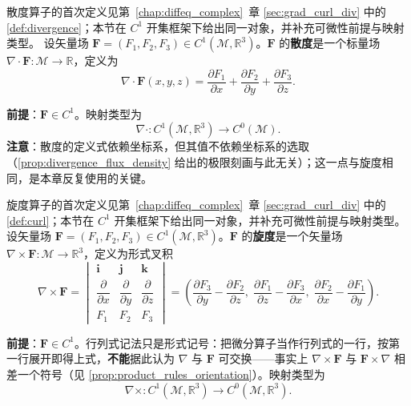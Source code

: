 \begin{definition}[散度]\label{def:divergence_vf}
散度算子的首次定义见第~\ref{chap:diffeq_complex}~章 \cref{sec:grad_curl_div} 中的 \cref{def:divergence}；本节在 $C^1$ 开集框架下给出同一对象，并补充可微性前提与映射类型。
设矢量场 $\mathbf{F} = (F_1, F_2, F_3) \in C^1(\mathcal{M}, \mathbb{R}^3)$。$\mathbf{F}$ 的\textbf{散度}是一个标量场 $\nabla \cdot \mathbf{F}: \mathcal{M} \to \mathbb{R}$，定义为
\[
\nabla \cdot \mathbf{F}(x,y,z) = \frac{\partial F_1}{\partial x} + \frac{\partial F_2}{\partial y} + \frac{\partial F_3}{\partial z}.
\]

\textbf{前提}：$\mathbf F\in C^1$。映射类型为
\[
\nabla\cdot: C^1(\mathcal{M}, \mathbb{R}^3) \to C^0(\mathcal{M}).
\]
\textbf{注意}：散度的定义式依赖坐标系，但其值不依赖坐标系的选取（\cref{prop:divergence_flux_density} 给出的极限刻画与此无关）；这一点与旋度相同，是本章反复使用的关键。
\end{definition}

\begin{definition}[旋度]\label{def:curl_vf}
旋度算子的首次定义见第~\ref{chap:diffeq_complex}~章 \cref{sec:grad_curl_div} 中的 \cref{def:curl}；本节在 $C^1$ 开集框架下给出同一对象，并补充可微性前提与映射类型。
设矢量场 $\mathbf{F} = (F_1, F_2, F_3) \in C^1(\mathcal{M}, \mathbb{R}^3)$。$\mathbf{F}$ 的\textbf{旋度}是一个矢量场 $\nabla \times \mathbf{F}: \mathcal{M} \to \mathbb{R}^3$，定义为形式叉积
\[
\nabla \times \mathbf{F} = \begin{vmatrix}
\mathbf{i} & \mathbf{j} & \mathbf{k} \\[2pt]
\dfrac{\partial}{\partial x} & \dfrac{\partial}{\partial y} & \dfrac{\partial}{\partial z} \\[6pt]
F_1 & F_2 & F_3
\end{vmatrix}
= \left( \frac{\partial F_3}{\partial y} - \frac{\partial F_2}{\partial z},\;
\frac{\partial F_1}{\partial z} - \frac{\partial F_3}{\partial x},\;
\frac{\partial F_2}{\partial x} - \frac{\partial F_1}{\partial y} \right).
\]

\textbf{前提}：$\mathbf F\in C^1$。行列式记法只是形式记号：把微分算子当作行列式的一行，按第一行展开即得上式，\textbf{不能}据此认为 $\nabla$ 与 $\mathbf F$ 可交换——事实上 $\nabla\times\mathbf F$ 与 $\mathbf F\times\nabla$ 相差一个符号（见 \cref{prop:product_rules_orientation}）。映射类型为
\[
\nabla\times: C^1(\mathcal{M}, \mathbb{R}^3) \to C^0(\mathcal{M}, \mathbb{R}^3).
\]
\end{definition}

